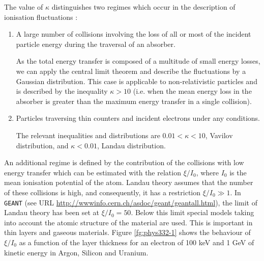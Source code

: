 \documentclass{article}
\newcommand{\GEANT}{\texttt{GEANT}}
\begin{document}
The value of $\kappa$ distinguishes two regimes which occur in the
description of ionisation fluctuations :
 
\begin{enumerate}
\item A large number of collisions involving the loss of all or most
  of the incident particle energy during the traversal of an absorber.
  
  As the total energy transfer is composed of a multitude of small
  energy losses, we can apply the central limit theorem and describe
  the fluctuations by a Gaussian distribution.  This case is
  applicable to non-relativistic particles and is described by the
  inequality $\kappa > 10 $ (i.e. when the mean energy loss in the
  absorber is greater than the maximum energy transfer in a single
  collision).
  
\item Particles traversing thin counters and incident electrons under
  any conditions.
  
  The relevant inequalities and distributions are $ 0.01 < \kappa < 10
  $, Vavilov distribution, and $\kappa < 0.01 $, Landau distribution.
\end{enumerate}

An additional regime is defined by the contribution of the collisions
with low energy transfer which can be estimated with the relation
$\xi/I_0$, where $I_0$ is the mean ionisation potential of the atom.
Landau theory assumes that the number of these collisions is high, and
consequently, it has a restriction $\xi/I_0 \gg 1$.  In \GEANT{}
(see URL \url{http://wwwinfo.cern.ch/asdoc/geant/geantall.html}), the
limit of Landau theory has been set at $\xi/I_0 = 50$.  Below this
limit special models taking into account the atomic structure of the
material are used.  This is important in thin layers and gaseous
materials.  Figure \ref{fg:phys332-1} shows the behaviour of $\xi/I_0$
as a function of the layer thickness for an electron of 100 keV and 1
GeV of kinetic energy in Argon, Silicon and Uranium.
\end{document}
